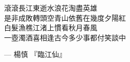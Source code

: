 \thispagestyle{empty}  %
\begin{center}
\begin{flushleft}
{\Large \vspace{3em} 滾滾長江東逝水\hspace{1em}浪花淘盡英雄\\
是非成敗轉頭空\hspace{1em}青山依舊在\hspace{1em}幾度夕陽紅\\
白髮漁樵江渚上\hspace{1em}慣看秋月春風\\
一壺濁酒喜相逢\hspace{1em}古今多少事\hspace{1em}都付笑談中\\}
\end{flushleft}
\end{center}
\begin{flushright}
--- 楊慎 『臨江仙』
\end{flushright}

\setlength{\abovedisplayskip}{-5pt}
\setlength{\abovedisplayshortskip}{-5pt}
